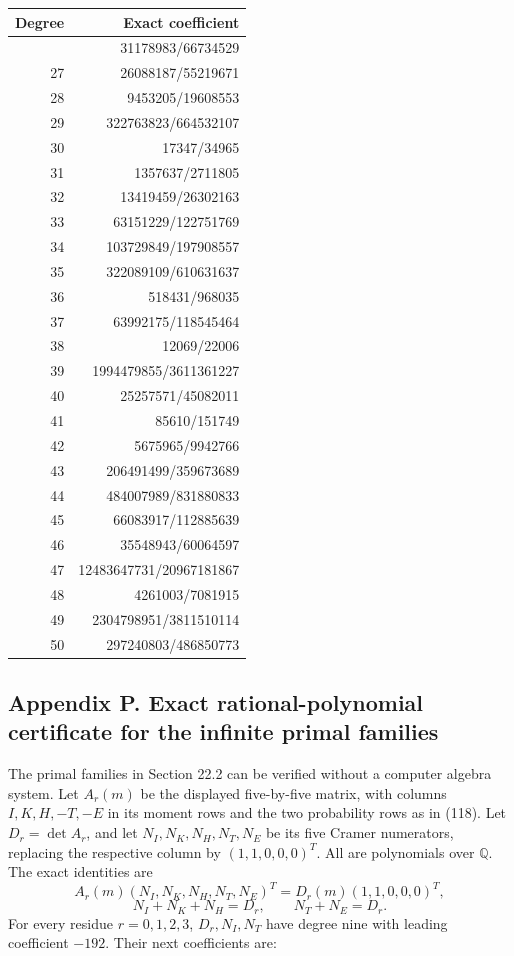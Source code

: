 \documentclass[
  11pt,
]{article}
\begin{document}
\begin{longtable}[]{@{}rr@{}}
\toprule\noalign{}
Degree & Exact coefficient \\
\midrule\noalign{}
\endhead
\bottomrule\noalign{}
\endlastfoot
26 & 31178983/66734529 \\
27 & 26088187/55219671 \\
28 & 9453205/19608553 \\
29 & 322763823/664532107 \\
30 & 17347/34965 \\
31 & 1357637/2711805 \\
32 & 13419459/26302163 \\
33 & 63151229/122751769 \\
34 & 103729849/197908557 \\
35 & 322089109/610631637 \\
36 & 518431/968035 \\
37 & 63992175/118545464 \\
38 & 12069/22006 \\
39 & 1994479855/3611361227 \\
40 & 25257571/45082011 \\
41 & 85610/151749 \\
42 & 5675965/9942766 \\
43 & 206491499/359673689 \\
44 & 484007989/831880833 \\
45 & 66083917/112885639 \\
46 & 35548943/60064597 \\
47 & 12483647731/20967181867 \\
48 & 4261003/7081915 \\
49 & 2304798951/3811510114 \\
50 & 297240803/486850773 \\
\end{longtable}

\subsection{Appendix P. Exact rational-polynomial certificate for the
infinite primal
families}\label{appendix-p.-exact-rational-polynomial-certificate-for-the-infinite-primal-families}

The primal families in Section 22.2 can be verified without a computer
algebra system. Let \(A_r(m)\) be the displayed five-by-five matrix,
with columns \(I,K,H,-T,-E\) in its moment rows and the two probability
rows as in (118). Let \(D_r=\det A_r\), and let \(N_I,N_K,N_H,N_T,N_E\)
be its five Cramer numerators, replacing the respective column by
\((1,1,0,0,0)^T\). All are polynomials over \(\mathbb Q\). The exact
identities are \[
A_r(m)(N_I,N_K,N_H,N_T,N_E)^T
 =D_r(m)(1,1,0,0,0)^T,
\] \[
N_I+N_K+N_H=D_r,
\qquad N_T+N_E=D_r.
\] For every residue \(r=0,1,2,3\), \(D_r,N_I,N_T\) have degree nine
with leading coefficient \(-192\). Their next coefficients are:
\end{document}
